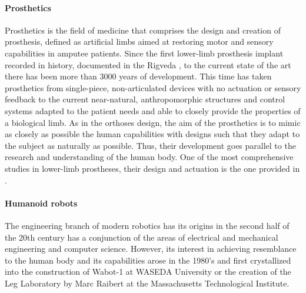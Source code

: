 \paragraph{Prosthetics} %
\label{par:prosthetics}
Prosthetics is the field of medicine that comprises the design and creation of prosthesis, defined as artificial limbs aimed at restoring motor and sensory capabilities in amputee patients.
Since the first lower-limb prosthesis implant recorded in history, documented in the Rigveda \cite{prosthetics_history}, to the current state of the art there has been more than 3000 years of development.
This time has taken prosthetics from single-piece, non-articulated devices with no actuation or sensory feedback to the current near-natural, anthropomorphic structures and control systems adapted to the patient needs and able to closely provide the properties of a biological limb.
As in the orthoses design, the aim of the prosthetics is to mimic as closely as possible the human capabilities with designs such that they adapt to the subject as naturally as possible.
Thus, their development goes parallel to the research and understanding of the human body.
One of the most comprehensive studies in lower-limb prostheses, their design and actuation is the one provided in \cite{grimmer}.


\paragraph{Humanoid robots} %
\label{par:humanoid_robots}
The engineering branch of modern robotics has its origins in the second half of the 20th century has a conjunction of the areas of electrical and mechanical engineering and computer science.
However, its interest in achieving resemblance to the human body and its capabilities arose in the 1980's and first crystallized into the construction of Wabot-1 at WASEDA University or the creation of the Leg Laboratory by Marc Raibert at the Massachusetts Technological Institute.

